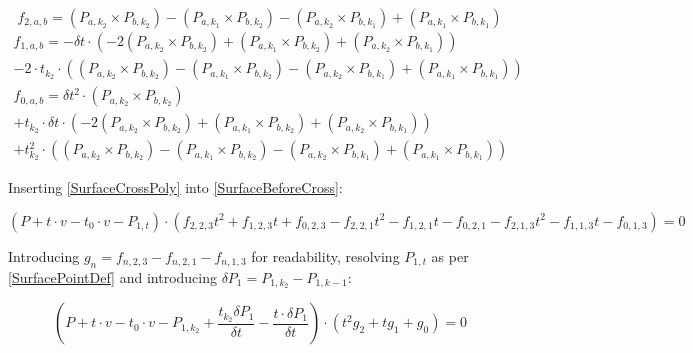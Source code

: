 \begin{equation}\label{SurfaceFStart}
    f_{2, a, b} = (P_{a, k_2} \times P_{b, k_2})
    - (P_{a, k_1} \times P_{b, k_2})
    - (P_{a, k_2} \times P_{b, k_1})
    + (P_{a, k_1} \times P_{b, k_1})
\end{equation}
\begin{equation}
    \begin{split}
        f_{1, a, b} = - \delta t \cdot (
        - 2 (P_{a, k_2} \times P_{b, k_2})
        + (P_{a, k_1} \times P_{b, k_2})
        + (P_{a, k_2} \times P_{b, k_1})
        )
        \\
        - 2 \cdot t_{k_2} \cdot (
        (P_{a, k_2} \times P_{b, k_2})
        - (P_{a, k_1} \times P_{b, k_2})
        - (P_{a, k_2} \times P_{b, k_1})
        + (P_{a, k_1} \times P_{b, k_1})
        )
    \end{split}
\end{equation}
\begin{equation}\label{SurfaceFEnd}
    \begin{split}
        f_{0, a, b} = \delta t^2 \cdot (P_{a, k_2} \times P_{b, k_2})
        \\
        + t_{k_2} \cdot \delta t \cdot (
        - 2 (P_{a, k_2} \times P_{b, k_2})
        + (P_{a, k_1} \times P_{b, k_2})
        + (P_{a, k_2} \times P_{b, k_1})
        )
        \\
        + t_{k_2}^2 \cdot (
        (P_{a, k_2} \times P_{b, k_2})
        - (P_{a, k_1} \times P_{b, k_2})
        - (P_{a, k_2} \times P_{b, k_1})
        + (P_{a, k_1} \times P_{b, k_1})
        )
    \end{split}
\end{equation}

Inserting \eqref{SurfaceCrossPoly} into \eqref{SurfaceBeforeCross}:

\begin{equation*}
    (P + t \cdot v - t_0 \cdot v - P_{1, t}) \cdot
    (f_{2, 2, 3} t^2 + f_{1, 2, 3} t + f_{0, 2, 3} - f_{2, 2, 1} t^2 - f_{1, 2, 1} t - f_{0, 2, 1} - f_{2, 1, 3} t^2 - f_{1, 1, 3} t - f_{0, 1, 3})
    = 0
\end{equation*}

Introducing \(g_n = f_{n, 2, 3} - f_{n, 2, 1} - f_{n, 1, 3}\) for readability,
resolving \(P_{1, t}\) as per \eqref{SurfacePointDef} and introducing \(\delta P_1 = P_{1, k_2} - P_{1, k-1}\):

\begin{equation}
    (P + t \cdot v - t_0 \cdot v - P_{1, k_2} + \frac{t_{k_2} \delta P_1}{\delta t} - \frac{t \cdot \delta P_1}{\delta t}) \cdot
    (
    t^2 g_2
    + t g_1
    + g_0
    )
    = 0
\end{equation}

